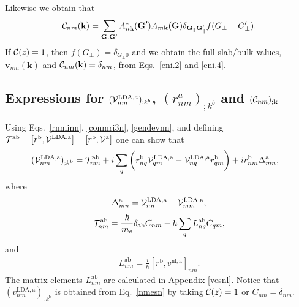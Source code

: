\documentclass[floatfix,prb,aps,superscriptaddress,showpacs,11pt,preprint,letterpaper]{revtex4}
\begin{document}
Likewise we obtain that
\begin{align}\label{eni.4}
{\mathbf{\cal C}}_{nm}(\mathbf{k})=
\sum_{\mathbf{G},\mathbf{G}'} A^*_{n\mathbf{k}}(\mathbf{G}')  A_{m\mathbf{k}}(\mathbf{G})
\delta_{\mathbf{G}_\parallel \mathbf{G}'_\parallel} 
f(G_\perp-G'_\perp)
.
\end{align}  
If ${\mathbf{\cal C}}(z)=1$, then $f(G_\perp)=\delta_{G_\perp 0}$ and we 
obtain the full-slab/bulk values, 
$\mathbf{v}_{nm}(\mathbf{k})$ and ${\mathbf{\cal C}}_{nm}(\mathbf{k})=\delta_{nm}$,
from Eqs.~\eqref{eni.2} and \eqref{eni.4}.

\subsection{Expressions for 
\texorpdfstring{$({\mathbf{\cal V}}^{\mathrm{LDA},a}_{nm})_{;k^b}$}{Vnonlocal},
\texorpdfstring{$(r^a_{nm})_{;k^b}$}{Vnonlocal}
and \texorpdfstring{$({\mathbf{\cal C}}_{nm})_{;\mathbf{k}}$}{Vnonlocal}
}\label{appvnl}

Using Eqs.~\eqref{rnminn}, \eqref{conmri3n}, \eqref{gendevnn}, and
defining 
$
{\cal T}^{\mathrm{a}\mathrm{b}}\equiv[r^{\mathrm{b}},{\mathbf{\cal V}}^{\mathrm{LDA},\mathrm{a}}]
\equiv
[r^{\mathrm{b}},{\mathbf{\cal V}}^\mathrm{a}]
$
one can show that
\begin{align}\label{nmesn}
({\mathbf{\cal V}}^{\mathrm{LDA},\mathrm{a}}_{nm})_{;k^{\mathrm{b}}}&=
{\cal T}_{nm}^{\mathrm{a}\mathrm{b}}
+i
\sum_{q}
\bigg(
r^{\mathrm{b}}_{nq}  
{\mathbf{\cal V}}^{\mathrm{LDA},\mathrm{a}}_{q m}
-
{\mathbf{\cal V}}^{\mathrm{LDA},\mathrm{a}}_{nq}   
r^{\mathrm{b}}_{q m}
\bigg)  
+i  
r^{\mathrm{b}}_{nm}
\Delta^{\mathrm{a}}_{mn}
,
\end{align}
where
\begin{eqnarray}\label{tdel}
\Delta^{\mathrm{a}}_{mn}
=
{\mathbf{\cal V}}^{\mathrm{LDA},\mathrm{a}}_{nn}  
-
{\mathbf{\cal V}}^{\mathrm{LDA},\mathrm{a}}_{mm}  
,
\end{eqnarray} 
\begin{align}\label{tau.1}
{\cal T}_{nm}^{\mathrm{a}\mathrm{b}}
=
\frac{\hbar}{m_e}\delta_{\mathrm{a}\mathrm{b}} 
C_{nm} 
-\hbar 
\sum_q  
L^{\mathrm{a}\mathrm{b}}_{nq} 
C_{qm} 
,
\end{align}   
and
\begin{align}\label{lab}
L_{nm}^{\mathrm{a}\mathrm{b}}
=\frac{i}{\hbar}[r^{\mathrm{b}},v^{\mathrm{nl},\mathrm{a}}]_{nm}
.
\end{align}  
The matrix elements $L^{\mathrm{a}\mathrm{b}}_{nm}$
are calculated in Appendix \ref{vesnl}.
Notice that
$(v^{\mathrm{LDA},\mathrm{a}}_{nm})_{;k^{\mathrm{b}}}$ is obtained 
from Eq.~\eqref{nmesn} by 
taking 
${\mathbf{\cal C}}(z)=1$ or $C_{nm}=\delta_{nm}$.
\end{document}
